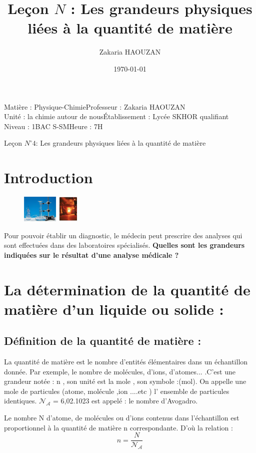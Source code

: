 \documentclass[12pt]{article}
\title{Leçon $N$ : Les grandeurs physiques liées à la quantité de matière }
\author{Zakaria HAOUZAN}
\date{\today}
\newcommand\headerMe[2]{\noindent{}#1\hfill#2}
\begin{document}
\headerMe{Matière : Physique-Chimie}{Professeur : Zakaria HAOUZAN}\\
\headerMe{Unité : la chimie autour de nous}{Établissement : Lycée SKHOR qualifiant}\\
\headerMe{Niveau : 1BAC S-SM}{Heure : 7H}\\

\begin{center}
    \Large{Leçon $N^{\circ}4$: \color{red}Les grandeurs physiques liées à la quantité de matière}
\end{center}

\section{Introduction}

\begin{figure}
    \centering
\includegraphics[width=0.25\textwidth]{./img/img00.png}
\end{figure} 
Pour pouvoir établir un diagnostic, le médecin peut
prescrire des analyses qui sont effectuées dans des
laboratoires spécialisés.
\textbf{Quelles sont les grandeurs indiquées sur le résultat d’une
analyse médicale ?}

\section{La détermination de la quantité de matière d'un liquide ou solide :}
    \subsection{Définition de la quantité de matière :}
La quantité de matière est le nombre d’entités élémentaires dans un échantillon donnée. Par
exemple, le nombre de molécules, d’ions, d’atomes... .C'est une grandeur
notée : n , son unité est la mole , son symbole :(mol).
On appelle une mole de particules (atome, molécule ,ion ....etc ) l' ensemble de particules identiques.
$\mathscr{N_A}$ = 6,02.1023 est appelé : le nombre d'Avogadro.

Le nombre N d’atome, de molécules ou d’ions contenus dans l’échantillon est proportionnel à la
quantité de matière n correspondante. D’où la relation :$$n =\frac{N}{\mathscr{N_A}} $$
\end{document}
